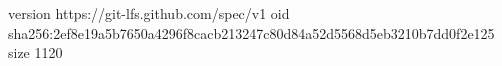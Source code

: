 version https://git-lfs.github.com/spec/v1
oid sha256:2ef8e19a5b7650a4296f8cacb213247c80d84a52d5568d5eb3210b7dd0f2e125
size 1120
